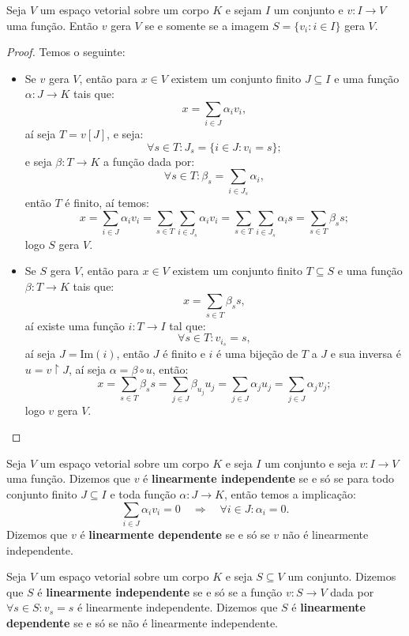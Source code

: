 \documentclass[11pt,twoside,a4paper]{book}
\begin{document}
\begin{proposicao}
Seja $V$ um espaço vetorial sobre um corpo $K$ e sejam $I$ um conjunto e $v:I\rightarrow V$ uma função. Então $v$ gera $V$ se e somente se a imagem $S=\{v_i:i\in I\}$ gera $V$.
\end{proposicao}
\begin{proof}
Temos o seguinte:
\begin{itemize}
\item Se $v$ gera $V$, então para $x\in V$ existem um conjunto finito $J\subseteq I$ e uma função $\alpha:J\rightarrow K$ tais que:
\[
x=\sum_{i\in J}\alpha_iv_i,
\]
aí seja $T=v[J]$, e seja:
\[
\forall s\in T:J_s=\{i\in J:v_i=s\};
\]
e seja $\beta:T\rightarrow K$ a função dada por:
\[
\forall s\in T:\beta_s=\sum_{i\in J_s}\alpha_i,
\]
então $T$ é finito, aí temos:
\[
x=\sum_{i\in J}\alpha_iv_i=\sum_{s\in T}\sum_{i\in J_s}\alpha_iv_i=\sum_{s\in T}\sum_{i\in J_s}\alpha_is=\sum_{s\in T}\beta_ss;
\]
logo $S$ gera $V$.
\item Se $S$ gera $V$, então para $x\in V$ existem um conjunto finito $T\subseteq S$ e uma função $\beta:T\rightarrow K$ tais que:
\[
x=\sum_{s\in T}\beta_ss,
\]
aí existe uma função $i:T\rightarrow I$ tal que:
\[
\forall s\in T:v_{i_s}=s,
\]
aí seja $J=\mathrm{Im}(i)$, então $J$ é finito e $i$ é uma bijeção de $T$ a $J$ e sua inversa é $u=v\upharpoonright J$, aí seja $\alpha=\beta\circ u$, então:
\[
x=\sum_{s\in T}\beta_ss=\sum_{j\in J}\beta_{u_j}u_j=\sum_{j\in J}\alpha_ju_j=\sum_{j\in J}\alpha_jv_j;
\]
logo $v$ gera $V$.\qedhere
\end{itemize}
\end{proof}

\begin{definicao}
Seja $V$ um espaço vetorial sobre um corpo $K$ e seja $I$ um conjunto e seja $v:I\rightarrow V$ uma função. Dizemos que $v$ é \textbf{linearmente independente} se e só se para todo conjunto finito $J\subseteq I$ e toda função $\alpha:J\rightarrow K$, então temos a implicação:
\[
\sum_{i\in J}\alpha_iv_i=0\quad\Rightarrow\quad\forall i\in J:\alpha_i=0.
\]
Dizemos que $v$ é \textbf{linearmente dependente} se e só se $v$ não é linearmente independente.
\end{definicao}

\begin{definicao}
Seja $V$ um espaço vetorial sobre um corpo $K$ e seja $S\subseteq V$ um conjunto. Dizemos que $S$ é \textbf{linearmente independente} se e só se a função $v:S\rightarrow V$ dada por $\forall s\in S:v_s=s$ é linearmente independente. Dizemos que $S$ é \textbf{linearmente dependente} se e só se não é linearmente independente.
\end{definicao}
\end{document}
